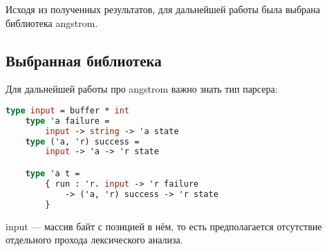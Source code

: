 Исходя из полученных результатов, для дальнейшей работы была выбрана библиотека angstrom.

\newpage
\subsection{Выбранная библиотека}

Для дальнейшей работы про angstrom важно знать тип парсера:

\begin{lstlisting}[escapechar=!,language=Caml]
    type input = buffer * int
    type 'a failure =
        input -> string -> 'a state
    type ('a, 'r) success =
        input -> 'a -> 'r state

    type 'a t =
        { run : 'r. input -> 'r failure
            -> ('a, 'r) success -> 'r state
        }
\end{lstlisting}

input --- массив байт с позицией в нём,
то есть предполагается отсутствие отдельного прохода лексического анализа.
